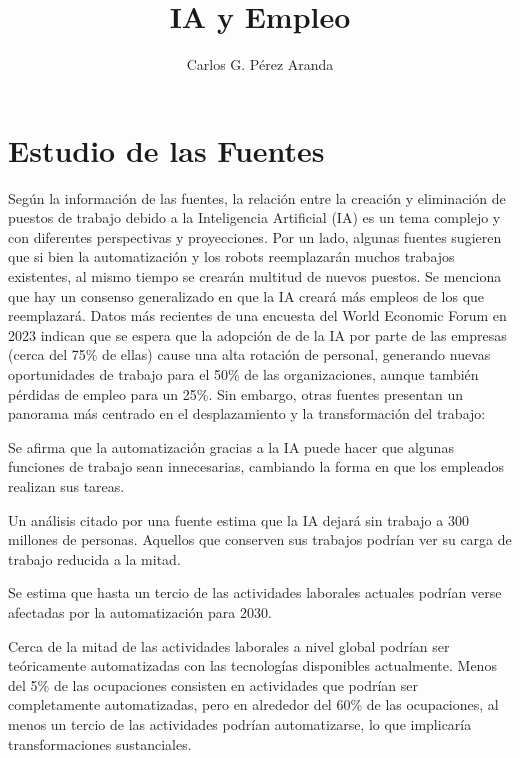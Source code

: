 \documentclass[12pt, a4paper, twoside]{article}
\title{IA y Empleo}
\author{Carlos G. Pérez Aranda}
\begin{document}
\maketitle
\newpage
\section{Estudio de las Fuentes}
Según la información de las fuentes, la relación entre la creación y eliminación de puestos de trabajo debido a la Inteligencia 
Artificial (IA) es un tema complejo y con diferentes perspectivas y proyecciones.
Por un lado, algunas fuentes sugieren que si bien la automatización y los robots reemplazarán muchos trabajos existentes, 
al mismo tiempo se crearán multitud de nuevos puestos\cite{rouhiainen2018inteligencia}. Se menciona que hay un consenso generalizado en que la IA creará más empleos 
de los que reemplazará\cite{tenes2023impacto}. Datos más recientes de una encuesta del World Economic Forum en 2023 indican que se espera que la adopción de 
de la IA por parte de las empresas (cerca del 75\% de ellas) cause una alta rotación de personal, generando nuevas oportunidades de 
trabajo para el 50\% de las organizaciones, aunque también pérdidas de empleo para un 25\%\cite{tenes2023impacto}.
Sin embargo, otras fuentes presentan un panorama más centrado en el desplazamiento y la transformación del trabajo:

Se afirma que la automatización gracias a la IA puede hacer que algunas funciones de trabajo sean innecesarias, cambiando la forma 
en que los empleados realizan sus tareas\cite{tenes2023impacto}\cite{valverde2019aplicaciones}.

Un análisis citado por una fuente estima que la IA dejará sin trabajo a 300 millones de personas. Aquellos que conserven sus 
trabajos podrían ver su carga de trabajo reducida a la mitad\cite{tenes2023impacto}.

Se estima que hasta un tercio de las actividades laborales actuales podrían verse afectadas por la automatización para 2030\cite{tenes2023impacto}.

Cerca de la mitad de las actividades laborales a nivel global podrían ser teóricamente automatizadas con las tecnologías disponibles 
actualmente. Menos del 5\% de las ocupaciones consisten en actividades que podrían ser completamente automatizadas, pero en alrededor del 
60\% de las ocupaciones, al menos un tercio de las actividades podrían automatizarse, lo que implicaría transformaciones sustanciales\cite{tenes2023impacto}.
\end{document}
